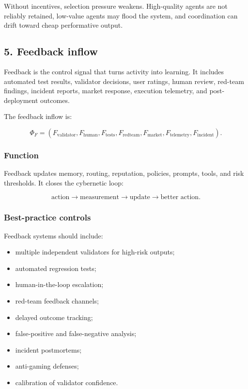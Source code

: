 \documentclass[
  11pt,
]{article}
\providecommand{\tightlist}{%
  \setlength{\itemsep}{0pt}\setlength{\parskip}{0pt}}
\begin{document}
Without incentives, selection pressure weakens. High-quality agents are
not reliably retained, low-value agents may flood the system, and
coordination can drift toward cheap performative output.

\subsection{5. Feedback inflow}\label{feedback-inflow}

Feedback is the control signal that turns activity into learning. It
includes automated test results, validator decisions, user ratings,
human review, red-team findings, incident reports, market response,
execution telemetry, and post-deployment outcomes.

The feedback inflow is:

\[
\Phi_F=(F_{\text{validator}},F_{\text{human}},F_{\text{tests}},F_{\text{redteam}},F_{\text{market}},F_{\text{telemetry}},F_{\text{incident}}).
\]

\subsubsection{Function}\label{function-4}

Feedback updates memory, routing, reputation, policies, prompts, tools,
and risk thresholds. It closes the cybernetic loop:

\[
\text{action}\rightarrow\text{measurement}\rightarrow\text{update}\rightarrow\text{better action}.
\]

\subsubsection{Best-practice controls}\label{best-practice-controls-4}

Feedback systems should include:

\begin{itemize}
\tightlist
\item
  multiple independent validators for high-risk outputs;
\item
  automated regression tests;
\item
  human-in-the-loop escalation;
\item
  red-team feedback channels;
\item
  delayed outcome tracking;
\item
  false-positive and false-negative analysis;
\item
  incident postmortems;
\item
  anti-gaming defenses;
\item
  calibration of validator confidence.
\end{itemize}
\end{document}
